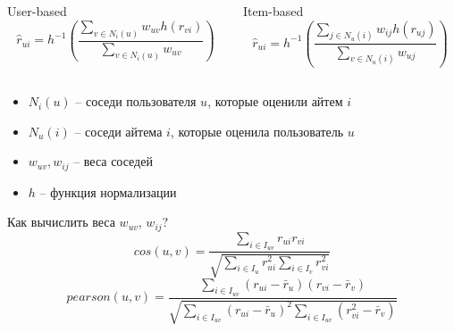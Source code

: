 \documentclass[11pt,aspectratio=169]{beamer}
\begin{document}
\begin{frame}

\begin{columns}
\begin{column}{0.45\textwidth}   
\quad\; User-based
   \[
   \hat r_{ui} = h^{-1} \left( \frac{\sum_{v \in N_i(u)} w_{uv} h(r_{vi})}{\sum_{v \in N_i(u)} w_{uv}} \right)
   \]
\end{column}
\begin{column}{0.45\textwidth}
\quad\; Item-based
  \[
  \hat r_{ui} = h^{-1} \left( \frac{\sum_{j \in N_u(i)} w_{ij} h(r_{uj})}{\sum_{v \in N_u(i)} w_{uj}} \right)
  \]
\end{column}
\end{columns}

\vfill

\begin{itemize}
\item $N_i(u)$ -- соседи пользователя $u$, которые оценили айтем $i$
\item $N_u(i)$ -- соседи айтема $i$, которые оценила пользователь $u$
\item $w_{uv}, w_{ij}$ -- веса соседей
\item $h$ -- функция нормализации
\end{itemize}

\end{frame}

\begin{frame}

Как вычислить веса $w_{uv}$, $w_{ij}$?
\[
cos(u, v) = \frac{\sum_{i \in I_{uv}} r_{ui} r_{vi}}{\sqrt{\sum_{i \in I_u} r_{ui}^2 \sum_{i \in I_v} r_{vi}^2}}
\]
\[
pearson(u, v) = \frac{\sum_{i \in I_{uv}} (r_{ui} - \bar r_u) (r_{vi} - \bar r_v)}{\sqrt{\sum_{i \in I_{uv}} (r_{ui} - \bar r_u)^2 \sum_{i \in I_{uv}} (r_{vi}^2 - \bar r_v)}}
\]

\end{frame}
\end{document}
